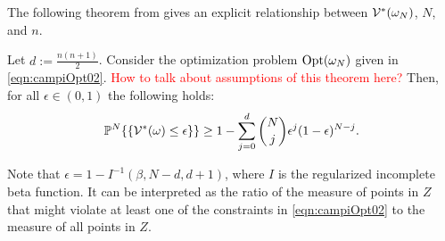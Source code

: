 The following theorem from \cite{campi} gives an explicit relationship between $\mathcal{V}^*(\omega_N)$, $N$, and $n$.
\begin{theorem}\label{thm:campi}Let $d:=\frac{n(n+1)}{2}$. Consider the optimization problem $\text{Opt}(\omega_N)$ given in \eqref{eqn:campiOpt02}. \textcolor{red}{How to talk about assumptions of this theorem here?} Then, for all $\epsilon \in (0,1)$ the following holds:
\begin{equation*}\mathbb{P}^N\{\{\mathcal{V}^*(\omega) \leq \epsilon\} \} \geq 1- \sum_{j=0}^{d} \binom{N}{j}\epsilon^j (1-\epsilon)^{N-j}.\end{equation*}
\end{theorem}
Note that $\epsilon=1-I^{-1}(\beta, N-d, d+1)$, where $I$ is the regularized incomplete beta function. It can be interpreted as the ratio of the measure of points in $Z$ that might violate at least one of the constraints in \eqref{eqn:campiOpt02} to the measure of all points in $Z$.


